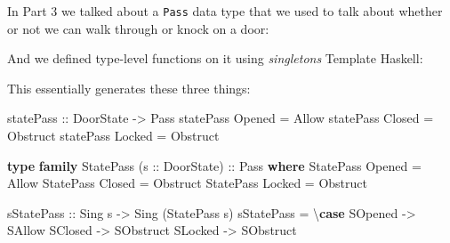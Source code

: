 \documentclass[]{article}
\newenvironment{Shaded}{}{}
\newcommand{\DataTypeTok}[1]{\textcolor[rgb]{0.56,0.13,0.00}{#1}}
\newcommand{\KeywordTok}[1]{\textcolor[rgb]{0.00,0.44,0.13}{\textbf{#1}}}
\newcommand{\NormalTok}[1]{#1}
\newcommand{\OperatorTok}[1]{\textcolor[rgb]{0.40,0.40,0.40}{#1}}
\newcommand{\OtherTok}[1]{\textcolor[rgb]{0.00,0.44,0.13}{#1}}
\begin{document}
In Part 3 we talked about a \texttt{Pass} data type that we used to talk about
whether or not we can walk through or knock on a door:

\begin{Shaded}
\end{Shaded}

And we defined type-level functions on it using \emph{singletons} Template
Haskell:

\begin{Shaded}
\end{Shaded}

This essentially generates these three things:

\begin{Shaded}
\begin{Highlighting}[]
\OtherTok{statePass ::} \DataTypeTok{DoorState} \OtherTok{{-}\textgreater{}} \DataTypeTok{Pass}
\NormalTok{statePass }\DataTypeTok{Opened} \OtherTok{=} \DataTypeTok{Allow}
\NormalTok{statePass }\DataTypeTok{Closed} \OtherTok{=} \DataTypeTok{Obstruct}
\NormalTok{statePass }\DataTypeTok{Locked} \OtherTok{=} \DataTypeTok{Obstruct}

\KeywordTok{type} \KeywordTok{family} \DataTypeTok{StatePass}\NormalTok{ (}\OtherTok{s ::} \DataTypeTok{DoorState}\NormalTok{)}\OtherTok{ ::} \DataTypeTok{Pass} \KeywordTok{where}
    \DataTypeTok{StatePass} \DataTypeTok{\textquotesingle{}Opened} \OtherTok{=} \DataTypeTok{\textquotesingle{}Allow}
    \DataTypeTok{StatePass} \DataTypeTok{\textquotesingle{}Closed} \OtherTok{=} \DataTypeTok{\textquotesingle{}Obstruct}
    \DataTypeTok{StatePass} \DataTypeTok{\textquotesingle{}Locked} \OtherTok{=} \DataTypeTok{\textquotesingle{}Obstruct}

\OtherTok{sStatePass ::} \DataTypeTok{Sing}\NormalTok{ s }\OtherTok{{-}\textgreater{}} \DataTypeTok{Sing}\NormalTok{ (}\DataTypeTok{StatePass}\NormalTok{ s)}
\NormalTok{sStatePass }\OtherTok{=}\NormalTok{ \textbackslash{}}\KeywordTok{case}
    \DataTypeTok{SOpened} \OtherTok{{-}\textgreater{}} \DataTypeTok{SAllow}
    \DataTypeTok{SClosed} \OtherTok{{-}\textgreater{}} \DataTypeTok{SObstruct}
    \DataTypeTok{SLocked} \OtherTok{{-}\textgreater{}} \DataTypeTok{SObstruct}
\end{Highlighting}
\end{Shaded}
\end{document}
